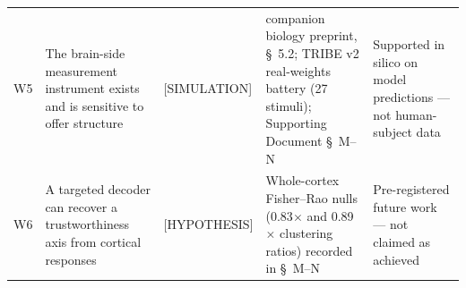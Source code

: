 \documentclass[11pt,twocolumn]{article}
\begin{document}
\begin{table}[t!]
\begin{tabular}{@{}p{} p{} p{} p{} p{}@{}}
W5 & The brain-side measurement instrument exists and is sensitive to offer structure & \hspace{0pt}[SIMULATION] & companion biology preprint, \S~5.2; TRIBE v2 real-weights battery (27 stimuli); Supporting Document \S~M--N & Supported in silico on model predictions --- not human-subject data \\
W6 & A targeted decoder can recover a trustworthiness axis from cortical responses & \hspace{0pt}[HYPOTHESIS] & Whole-cortex Fisher--Rao nulls (0.83$\times$ and 0.89$\times$ clustering ratios) recorded in \S~M--N & Pre-registered future work --- not claimed as achieved \\
\bottomrule
\end{tabular}
\end{table}
\end{document}
